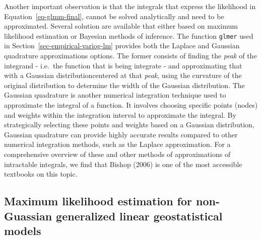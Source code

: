 \documentclass[
  letterpaper,
]{krantz}
\begin{document}
Another important observation is that the integrals that express the
likelihood in Equation~\ref{eq-glmm-final}, cannot be solved
analytically and need to be approximated. Several solution are available
that either based on maximum likelihood estimation or Bayesian methods
of inference. The function \texttt{glmer} used in
Section~\ref{sec-empirical-variog-lm} provides both the Laplace and
Gaussian quadrature approximations options. The former consists of
finding the \emph{peak} of the integrand - i.e.~the function that is
being integrate - and approximating that with a Gaussian
distributioncentered at that \emph{peak}, using the curvature of the
original distribution to determine the width of the Gaussian
distribution. The Gaussian quadrature is another numerical integration
technique used to approximate the integral of a function. It involves
choosing specific points (nodes) and weights within the integration
interval to approximate the integral. By strategically selecting these
points and weights based on a Gaussian distribution, Gaussian quadrature
can provide highly accurate results compared to other numerical
integration methods, such as the Laplace approximation. For a
comprehensive overview of these and other methods of approximations of
intractable integrals, we find that Bishop (2006) is one of the most
accessible textbooks on this topic.

\hypertarget{maximum-likelihood-estimation-for-non-guassian-generalized-linear-geostatistical-models}{%
\subsection{Maximum likelihood estimation for non-Guassian generalized
linear geostatistical
models}\label{maximum-likelihood-estimation-for-non-guassian-generalized-linear-geostatistical-models}}
\end{document}
